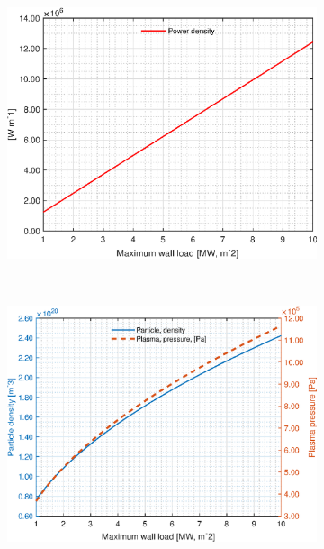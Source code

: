 \begin{figure}[H]
	\begin{subfigure}[h!]{.45\textwidth}
		\includegraphics[width=\textwidth]{MatlabFigures/PW/f5.eps}
	\end{subfigure}
	~
	\begin{subfigure}[h!]{.45\textwidth}
		\includegraphics[width=\textwidth]{MatlabFigures/PW/f6.eps}
	\end{subfigure}


\end{figure}
